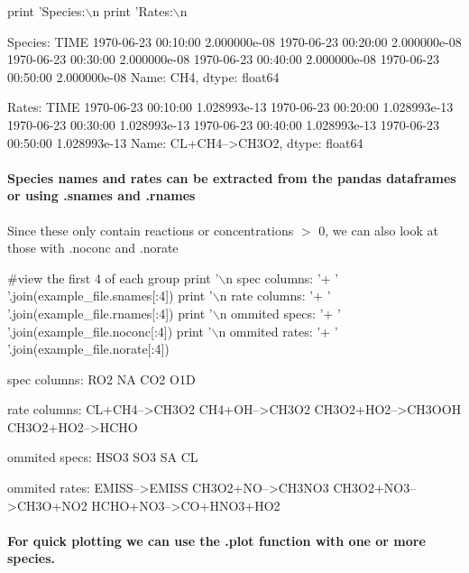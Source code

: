 \begin{DoxyCode}
print 'Species:\(\backslash\)n %
print 'Rates:\(\backslash\)n %
\end{DoxyCode}
 \begin{DoxyVerb}Species:
 TIME
1970-06-23 00:10:00    2.000000e-08
1970-06-23 00:20:00    2.000000e-08
1970-06-23 00:30:00    2.000000e-08
1970-06-23 00:40:00    2.000000e-08
1970-06-23 00:50:00    2.000000e-08
Name: CH4, dtype: float64

Rates:
 TIME
1970-06-23 00:10:00    1.028993e-13
1970-06-23 00:20:00    1.028993e-13
1970-06-23 00:30:00    1.028993e-13
1970-06-23 00:40:00    1.028993e-13
1970-06-23 00:50:00    1.028993e-13
Name: CL+CH4-->CH3O2, dtype: float64
\end{DoxyVerb}


\paragraph*{Species names and rates can be extracted from the pandas dataframes or using {\ttfamily .snames} and {\ttfamily .rnames}}

Since these only contain reactions or concentrations $>$ 0, we can also look at those with {\ttfamily .noconc} and {\ttfamily .norate}


\begin{DoxyCode}
#view the first 4 of each group
print '\(\backslash\)n spec columns: '+ ' '.join(example\_file.snames[:4])
print '\(\backslash\)n rate columns: '+ ' '.join(example\_file.rnames[:4])
print '\(\backslash\)n ommited specs: '+ ' '.join(example\_file.noconc[:4])
print '\(\backslash\)n ommited rates: '+ ' '.join(example\_file.norate[:4])
\end{DoxyCode}


\begin{DoxyVerb} spec columns: RO2 NA CO2 O1D

 rate columns: CL+CH4-->CH3O2 CH4+OH-->CH3O2 CH3O2+HO2-->CH3OOH CH3O2+HO2-->HCHO

 ommited specs: HSO3 SO3 SA CL

 ommited rates: EMISS-->EMISS CH3O2+NO-->CH3NO3 CH3O2+NO3-->CH3O+NO2 HCHO+NO3-->CO+HNO3+HO2
\end{DoxyVerb}


\paragraph*{For quick plotting we can use the {\ttfamily .plot} function with one or more species.}

